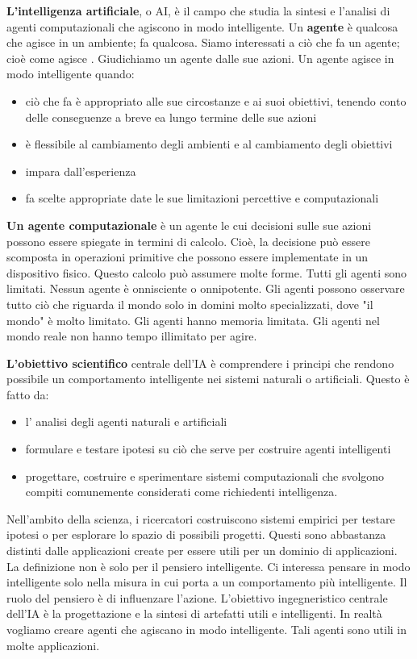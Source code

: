 \documentclass[a4paper]{extarticle}
\begin{document}
\textbf{L'intelligenza artificiale}, o AI, è il campo che studia la sintesi e l'analisi di agenti computazionali che agiscono in modo intelligente. Un \textbf{agente} è qualcosa che agisce in un ambiente; fa qualcosa. Siamo interessati a ciò che fa un agente; cioè come agisce . Giudichiamo un agente dalle sue azioni. Un agente agisce in modo intelligente quando:
\begin{itemize}
\item ciò che fa è appropriato alle sue circostanze e ai suoi obiettivi, tenendo conto delle conseguenze a breve ea lungo termine delle sue azioni
\item è flessibile al cambiamento degli ambienti e al cambiamento degli obiettivi
\item impara dall'esperienza
\item fa scelte appropriate date le sue limitazioni percettive e computazionali
\end{itemize}
\textbf{Un agente computazionale} è un agente le cui decisioni sulle sue azioni possono essere spiegate in termini di calcolo. Cioè, la decisione può essere scomposta in operazioni primitive che possono essere implementate in un dispositivo fisico. Questo calcolo può assumere molte forme. Tutti gli agenti sono limitati. Nessun agente è onnisciente o onnipotente. Gli agenti possono osservare tutto ciò che riguarda il mondo solo in domini molto specializzati, dove "il mondo" è molto limitato. Gli agenti hanno memoria limitata. Gli agenti nel mondo reale non hanno tempo illimitato per agire.

\textbf{L'obiettivo scientifico} centrale dell'IA è comprendere i principi che rendono possibile un comportamento intelligente nei sistemi naturali o artificiali. Questo è fatto da:
\begin{itemize}
\item l' analisi degli agenti naturali e artificiali
\item formulare e testare ipotesi su ciò che serve per costruire agenti intelligenti 
\item progettare, costruire e sperimentare sistemi computazionali che svolgono compiti comunemente considerati come richiedenti intelligenza.
\end{itemize}

Nell'ambito della scienza, i ricercatori costruiscono sistemi empirici per testare ipotesi o per esplorare lo spazio di possibili progetti. Questi sono abbastanza distinti dalle applicazioni create per essere utili per un dominio di applicazioni. La definizione non è solo per il pensiero intelligente. Ci interessa pensare in modo intelligente solo nella misura in cui porta a un comportamento più intelligente. Il ruolo del pensiero è di influenzare l'azione. L'obiettivo ingegneristico centrale dell'IA è la progettazione e la sintesi di artefatti utili e intelligenti. In realtà vogliamo creare agenti che agiscano in modo intelligente. Tali agenti sono utili in molte applicazioni.
\end{document}

